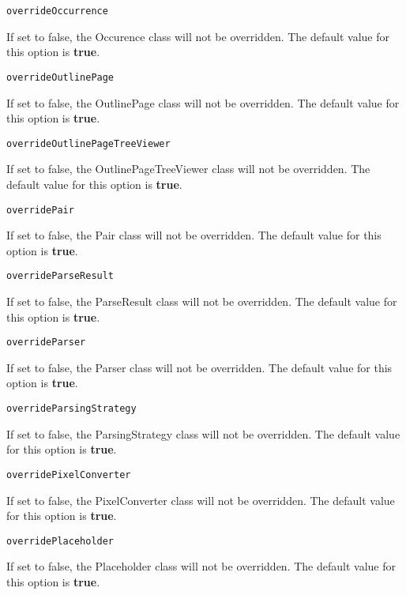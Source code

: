 \noindent\texttt{overrideOccurrence}
\begin{myindentpar}{1cm}
If set to false, the Occurence class will not be overridden. The default value for this option is \textbf{true}.
\end{myindentpar}

\noindent\texttt{overrideOutlinePage}
\begin{myindentpar}{1cm}
If set to false, the OutlinePage class will not be overridden. The default value for this option is \textbf{true}.
\end{myindentpar}

\noindent\texttt{overrideOutlinePageTreeViewer}
\begin{myindentpar}{1cm}
If set to false, the OutlinePageTreeViewer class will not be overridden. The default value for this option is \textbf{true}.
\end{myindentpar}

\noindent\texttt{overridePair}
\begin{myindentpar}{1cm}
If set to false, the Pair class will not be overridden. The default value for this option is \textbf{true}.
\end{myindentpar}

\noindent\texttt{overrideParseResult}
\begin{myindentpar}{1cm}
If set to false, the ParseResult class will not be overridden. The default value for this option is \textbf{true}.
\end{myindentpar}

\noindent\texttt{overrideParser}
\begin{myindentpar}{1cm}
If set to false, the Parser class will not be overridden. The default value for this option is \textbf{true}.
\end{myindentpar}

\noindent\texttt{overrideParsingStrategy}
\begin{myindentpar}{1cm}
If set to false, the ParsingStrategy class will not be overridden. The default value for this option is \textbf{true}.
\end{myindentpar}

\noindent\texttt{overridePixelConverter}
\begin{myindentpar}{1cm}
If set to false, the PixelConverter class will not be overridden. The default value for this option is \textbf{true}.
\end{myindentpar}

\noindent\texttt{overridePlaceholder}
\begin{myindentpar}{1cm}
If set to false, the Placeholder class will not be overridden. The default value for this option is \textbf{true}.
\end{myindentpar}

